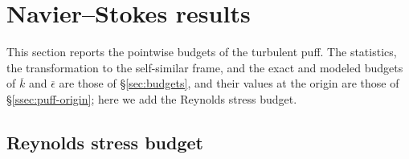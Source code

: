 \documentclass{article}
\begin{document}
\section{Navier--Stokes results}\label{sec:ns-results}

This section reports the pointwise budgets of the turbulent puff. The
statistics, the transformation to the self-similar frame, and the exact and
modeled budgets of $\overline{k}$ and $\overline{\epsilon}$ are those of
\S\ref{sec:budgets}, and their values at the origin are those of
\S\ref{ssec:puff-origin}; here we add the Reynolds stress budget.

\subsection{Reynolds stress budget}\label{ssec:ns-pp-rs-budget}
\end{document}
